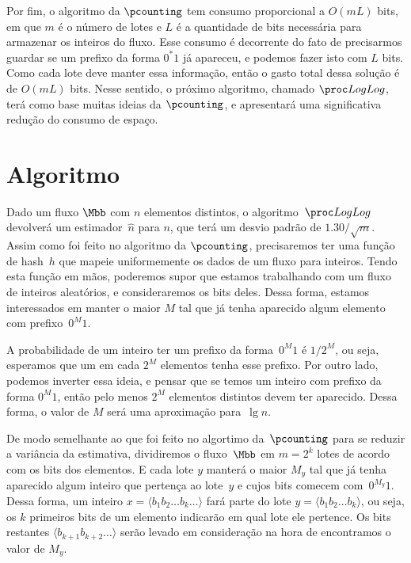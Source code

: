Por fim, o algoritmo da $\pcounting$ tem consumo proporcional a $O(mL)$ bits, em que $m$ é o número de lotes e $L$ é a
quantidade de bits necessária para armazenar os inteiros do fluxo. Esse consumo é decorrente do fato de precisarmos 
guardar se um prefixo da forma $0^{*}1$ já apareceu, e podemos fazer isto com $L$ bits. Como cada lote deve manter essa 
informação, então o gasto total dessa solução é de $O(mL)$ bits. Nesse sentido, o próximo algoritmo, chamado $\LOG$, 
terá como base muitas ideias da $\pcounting$, e apresentará uma significativa redução do consumo de espaço.

\section{Algoritmo }

Dado um fluxo $\Mbb$ com $n$ elementos distintos, o algoritmo~$\LOG$ devolverá um estimador~$\hat{n}$ para $n$, que terá
um desvio padrão de $1.30 / \sqrt{m}$. Assim como foi feito no algoritmo da $\pcounting$, precisaremos ter uma função de
hash~$h$ que mapeie uniformemente os dados de um fluxo para inteiros. Tendo esta função em mãos, poderemos supor que 
estamos trabalhando com um fluxo de inteiros aleatórios, e consideraremos os bits deles. Dessa forma, estamos 
interessados em manter o maior $M$ tal que já tenha aparecido algum elemento com prefixo~$0^{M}1$.

A probabilidade de um inteiro ter um prefixo da forma~$0^{M}1$ é $1 / 2^{M}$, ou seja, esperamos que um em cada $2^{M}$ 
elementos tenha esse prefixo. Por outro lado, podemos inverter essa ideia, e pensar que se temos um inteiro com prefixo 
da forma $0^{M}1$, então pelo menos $2^{M}$ elementos distintos devem ter aparecido. Dessa forma, o valor de $M$ será 
uma aproximação para~$\lg n$.

De modo semelhante ao que foi feito no algortimo da~$\pcounting$ para se reduzir a variância da estimativa, dividiremos 
o fluxo~$\Mbb$ em $m = 2^{k}$ lotes de acordo com os bits dos elementos. E cada lote $y$ manterá o maior $M_y$ tal que
já tenha aparecido algum inteiro que pertença ao lote~$y$ e cujos bits comecem com~$0^{M_y}1$. Dessa forma, um inteiro 
$x = \langle b_1 b_2 {\dots} b_k {\dots} \rangle$ fará parte do lote $y = \langle b_1 b_2 {\dots} b_k \rangle$, ou seja, 
os $k$ primeiros bits de um elemento indicarão em qual lote ele pertence. Os bits restantes 
$\langle b_{k+1} b_{k+2} {\dots} \rangle$ serão levado em consideração na hora de encontramos o valor de $M_y$.

